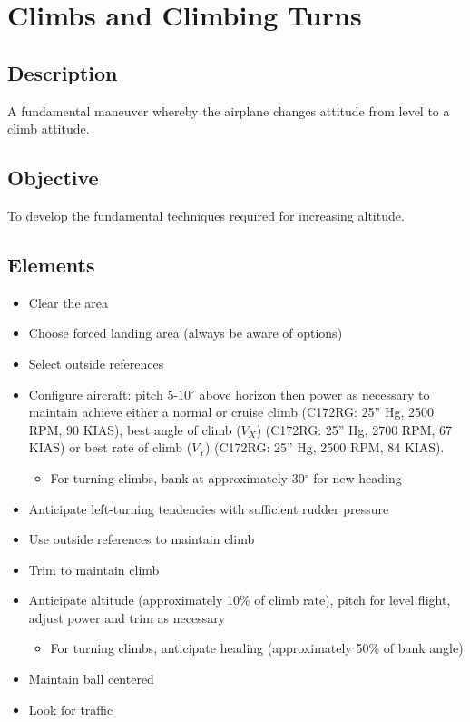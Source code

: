 \section{Climbs and Climbing Turns}

\subsection{Description}

A fundamental maneuver whereby the airplane changes attitude from level to a
climb attitude.

\subsection{Objective}

To develop the fundamental techniques required for increasing altitude.

\subsection{Elements}

\begin{itemize}
  \item Clear the area
  \item Choose forced landing area (always be aware of options) 
  \item Select outside references
  \item Configure aircraft: pitch 5-10$^\circ$ above horizon then power as necessary
    to maintain achieve either a normal or cruise climb (C172RG: 25'' Hg, 2500
    RPM, 90 KIAS), best angle of climb ($V_X$) (C172RG: 25'' Hg, 2700 RPM, 67
    KIAS) or best rate of climb ($V_Y$) (C172RG: 25'' Hg, 2500 RPM, 84 KIAS). 
    \begin{itemize}
      \item For turning climbs, bank at approximately 30$^\circ$ for new
        heading
    \end{itemize}
  \item Anticipate left-turning tendencies with sufficient rudder pressure
  \item Use outside references to maintain climb
  \item Trim to maintain climb
  \item Anticipate altitude (approximately 10\% of climb rate), pitch for level
    flight, adjust power and trim as necessary
    \begin{itemize}
      \item For turning climbs, anticipate heading (approximately 50\% of bank
        angle)
    \end{itemize}
  \item Maintain ball centered
  \item Look for traffic
\end{itemize}

